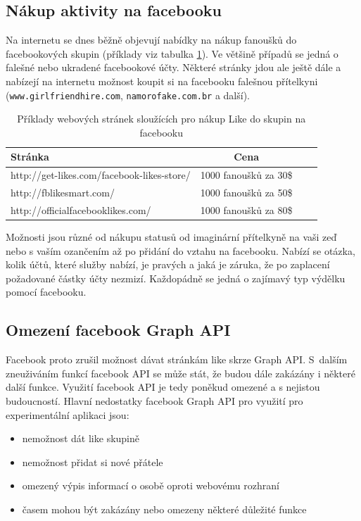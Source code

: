 \documentclass[thesis=M,czech]{FITthesis}[2013/05/10]
\begin{document}
\subsection{Nákup aktivity na facebooku}

Na internetu se dnes běžně objevují nabídky na nákup fanoušků do facebookových skupin (příklady viz tabulka \ref{tab:likesBuy}). Ve většině případů se jedná o falešné nebo ukradené facebookové účty. Některé stránky jdou ale ještě dále a nabízejí na internetu možnost koupit si na facebooku falešnou přítelkyni (\verb|www.girlfriendhire.com|, \verb|namorofake.com.br| a další). 

\begin{table}[h]
\centering
\caption{Příklady webových stránek sloužících pro nákup Like do skupin na facebooku}\label{tab:likesBuy}
\begin{tabular}{| l | c | p{5cm} | c |}
	\hline
	\textbf{Stránka} & 
	\textbf{Cena} \\ \hline
	
	http://get-likes.com/facebook-likes-store/ &
	1000 fanoušků za 30\$ \\ \hline
	
	http://fblikesmart.com/ &
	1000 fanoušků za 50\$ \\ \hline
	
	http://officialfacebooklikes.com/ &
	1000 fanoušků za 80\$ \\ \hline
\end{tabular}
\end{table}

Možnosti jsou různé od nákupu statusů od imaginární přítelkyně na vaši zeď nebo s vaším ozančením až po přidání do vztahu na facebooku. Nabízí se otázka, kolik účtů, které služby nabízí, je pravých a jaká je záruka, že po zaplacení požadované částky  účty nezmizí. Každopádně se jedná o zajímavý typ výdělku pomocí facebooku.

\subsection{Omezení facebook Graph API}

Facebook proto zrušil možnost dávat stránkám like skrze Graph API. S~dalším zneuživáním funkcí facebook API se může stát, že budou dále zakázány i některé další funkce. Využití facebook API je tedy poněkud omezené a s nejistou budoucností. Hlavní nedostatky facebook Graph API pro využití pro experimentální aplikaci jsou:

\begin{itemize}
  \item nemožnost dát like skupině
  \item nemožnost přidat si nové přátele
  \item omezený výpis informací o osobě oproti webovému rozhraní
  \item časem mohou být zakázány nebo omezeny některé důležité funkce
\end{itemize}
\end{document}
